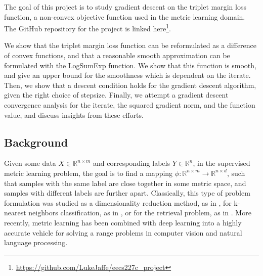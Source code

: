 \documentclass[11pt]{article}
\begin{document}
The goal of this project is to study gradient descent on the triplet margin loss function, a non-convex objective function used in the metric learning domain. The GitHub repository for the project is linked here\footnote{\url{https://github.com/LukeJaffe/eecs227c_project}}.

We show that the triplet margin loss function can be reformulated as a difference of convex functions, and that a reasonable smooth approximation can be formulated with the LogSumExp function. We show that this function is smooth, and give an upper bound for the smoothness which is dependent on the iterate. Then, we show that a descent condition holds for the gradient descent algorithm, given the right choice of stepsize. Finally, we attempt a gradient descent convergence analysis for the iterate, the squared gradient norm, and the function value, and discuss insights from these efforts.

\subsection{Background}
 
 Given some data $X \in \mathbb{R}^{n \times m}$ and corresponding labels $Y \in \mathbb{R}^n$, in the supervised metric learning problem, the goal is to find a mapping $\phi: \mathbb{R}^{n \times m} \rightarrow \mathbb{R}^{n \times d}$, such that samples with the same label are close together in some metric space, and samples with different labels are further apart. Classically, this type of problem formulation was studied as a dimensionality reduction method, as in \cite{hadsell_dimensionality_2006}, for k-nearest neighbors classification, as in \cite{weinberger_distance_2009}, or for the retrieval problem, as in \cite{araujo_large_2009}. More recently, metric learning has been combined with deep learning into a highly accurate vehicle for solving a range problems in computer vision and natural language processing. 
 
\end{document}
